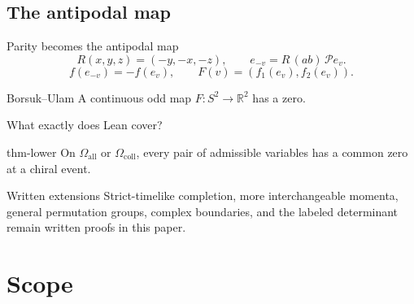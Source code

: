 \documentclass{beamer}
\begin{document}
\subsection{The antipodal map}
\begin{frame}{Parity becomes the antipodal map}
  \[
  R(x,y,z)=(-y,-x,-z),\qquad
  e_{-v}=R\,(ab)\,\mathcal P e_v.
  \]
  \[
  f(e_{-v})=-f(e_v),\qquad
  F(v)=(f_1(e_v),f_2(e_v)).
  \]
  \begin{block}{Borsuk--Ulam}
    A continuous odd map $F:S^2\to\mathbb R^2$ has a zero.
  \end{block}
\end{frame}
\begin{frame}{What exactly does Lean cover?}
  \begin{bookresult}{thm-lower}
    On $\Omega_{\mathrm{all}}$ or $\Omega_{\mathrm{coll}}$, every pair of admissible variables has a common zero at a chiral event.
  \end{bookresult}
  \begin{block}{Written extensions}
    Strict-timelike completion, more interchangeable momenta, general permutation groups, complex boundaries, and the labeled determinant remain written proofs in this paper.
  \end{block}
\end{frame}
\section{Scope}
\end{document}
